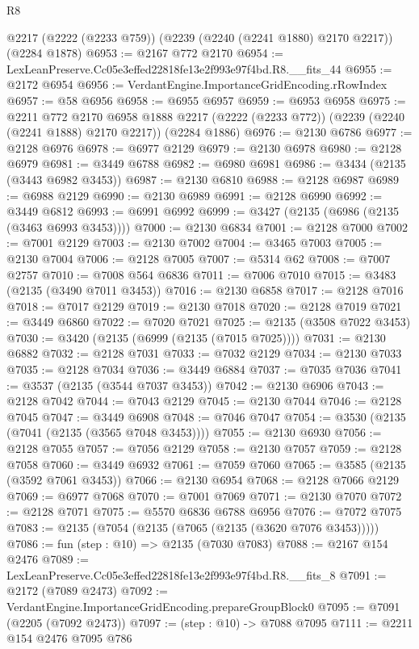 \begin{lexlean}{R8}
\begin{coremodule}
    @2217
    (@2222 (@2233 @759))
    (@2239 (@2240 (@2241 @1880) @2170 @2217))
    (@2284 @1878)
@6953 := @2167 @772 @2170
@6954 := LexLeanPreserve.Cc05e3effed22818fe13e2f993e97f4bd.R8.__fits_44
@6955 := @2172 @6954
@6956 := VerdantEngine.ImportanceGridEncoding.rRowIndex
@6957 := @58 @6956
@6958 := @6955 @6957
@6959 := @6953 @6958
@6975 := @2211
    @772
    @2170
    @6958
    @1888
    @2217
    (@2222 (@2233 @772))
    (@2239 (@2240 (@2241 @1888) @2170 @2217))
    (@2284 @1886)
@6976 := @2130 @6786
@6977 := @2128 @6976
@6978 := @6977 @2129
@6979 := @2130 @6978
@6980 := @2128 @6979
@6981 := @3449 @6788
@6982 := @6980 @6981
@6986 := @3434 (@2135 (@3443 @6982 @3453))
@6987 := @2130 @6810
@6988 := @2128 @6987
@6989 := @6988 @2129
@6990 := @2130 @6989
@6991 := @2128 @6990
@6992 := @3449 @6812
@6993 := @6991 @6992
@6999 := @3427 (@2135 (@6986 (@2135 (@3463 @6993 @3453))))
@7000 := @2130 @6834
@7001 := @2128 @7000
@7002 := @7001 @2129
@7003 := @2130 @7002
@7004 := @3465 @7003
@7005 := @2130 @7004
@7006 := @2128 @7005
@7007 := @5314 @62
@7008 := @7007 @2757
@7010 := @7008 @564 @6836
@7011 := @7006 @7010
@7015 := @3483 (@2135 (@3490 @7011 @3453))
@7016 := @2130 @6858
@7017 := @2128 @7016
@7018 := @7017 @2129
@7019 := @2130 @7018
@7020 := @2128 @7019
@7021 := @3449 @6860
@7022 := @7020 @7021
@7025 := @2135 (@3508 @7022 @3453)
@7030 := @3420 (@2135 (@6999 (@2135 (@7015 @7025))))
@7031 := @2130 @6882
@7032 := @2128 @7031
@7033 := @7032 @2129
@7034 := @2130 @7033
@7035 := @2128 @7034
@7036 := @3449 @6884
@7037 := @7035 @7036
@7041 := @3537 (@2135 (@3544 @7037 @3453))
@7042 := @2130 @6906
@7043 := @2128 @7042
@7044 := @7043 @2129
@7045 := @2130 @7044
@7046 := @2128 @7045
@7047 := @3449 @6908
@7048 := @7046 @7047
@7054 := @3530 (@2135 (@7041 (@2135 (@3565 @7048 @3453))))
@7055 := @2130 @6930
@7056 := @2128 @7055
@7057 := @7056 @2129
@7058 := @2130 @7057
@7059 := @2128 @7058
@7060 := @3449 @6932
@7061 := @7059 @7060
@7065 := @3585 (@2135 (@3592 @7061 @3453))
@7066 := @2130 @6954
@7068 := @2128 @7066 @2129
@7069 := @6977 @7068
@7070 := @7001 @7069
@7071 := @2130 @7070
@7072 := @2128 @7071
@7075 := @5570 @6836 @6788 @6956
@7076 := @7072 @7075
@7083 := @2135 (@7054 (@2135 (@7065 (@2135 (@3620 @7076 @3453)))))
@7086 := fun (step : @10) => @2135 (@7030 @7083)
@7088 := @2167 @154 @2476
@7089 := LexLeanPreserve.Cc05e3effed22818fe13e2f993e97f4bd.R8.__fits_8
@7091 := @2172 (@7089 @2473)
@7092 := VerdantEngine.ImportanceGridEncoding.prepareGroupBlock0
@7095 := @7091 (@2205 (@7092 @2473))
@7097 := (step : @10) -> @7088 @7095
@7111 := @2211
    @154
    @2476
    @7095
    @786

\end{coremodule}
\end{lexlean}

